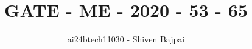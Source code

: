 \documentclass[journal]{IEEEtran}
\begin{document}
\onecolumn

\vspace{3cm}

\renewcommand{\thefigure}{\theenumi}
\renewcommand{\thetable}{\theenumi}

\title{GATE - ME - 2020 - 53 - 65}
\author{ai24btech11030 - Shiven Bajpai}
\maketitle

\iffalse
\begin{multicols}{4}
\begin{enumerate}
    \item 
    \item 
    \item 
    \item 
\end{enumerate}
\end{multicols}
\fi
\end{document}

